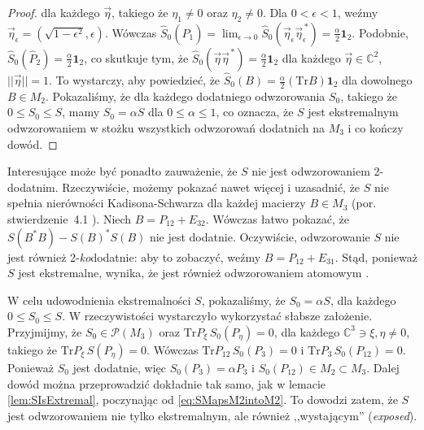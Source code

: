 {\begin{proof}
dla każdego $\vec{\eta}$, takiego że $\eta_{1} \neq 0$ oraz $\eta_{2} \neq 0$.
Dla $0 \!<\!\epsilon \!<\! 1$,
weźmy $\vec{\eta}_{\epsilon} = (\sqrt{1 - \epsilon^{2}}, \epsilon)$.
Wówczas $\hat{S}_{0} (\hat{P}_{1}) =
\lim_{\epsilon \rightarrow 0} \hat{S}_{0}
    (\vec{\eta}_{\epsilon} \vec{\eta}_{\epsilon}^{\,*}) =
\frac{\alpha}{2} \mathbf{1}_{2}$.
Podobnie,
$\hat{S}_{0} (\hat{P}_{2}) = \frac{\alpha}{2} \mathbf{1}_{2}$,
co skutkuje tym, że
$\hat{S}_{0} (\vec{\eta} \vec{\eta}^{\,*}) = \frac{\alpha}{2} \mathbf{1}_{2}$
dla każdego $\vec{\eta} \in \mathbb{C}^{2}$,
$||\vec{\eta}|| = 1$.
To wystarczy, aby powiedzieć, że
$\hat{S}_{0}(B) = \frac{\alpha}{2} (\text{Tr} B) \mathbf{1}_{2}$
dla dowolnego $B \in M_{2}$.
Pokazaliśmy, że dla każdego dodatniego odwzorowania $S_{0}$, takiego że
$0 \leq S_{0} \leq S$, mamy
$S_{0} = \alpha S$ dla $0 \leq \alpha \leq 1$,
co oznacza, że $S$ jest ekstremalnym odwzorowaniem w stożku wszystkich
odwzorowań dodatnich na $M_{3}$ i co kończy dowód.
\end{proof}

Interesujące może być ponadto zauważenie, że $S$ nie jest odwzorowaniem
2-dodatnim.
Rzeczywiście,
możemy pokazać nawet więcej i uzasadnić, że $S$
nie spełnia nierówności Kadisona-Schwarza dla każdej macierzy
$B \in M_{3}$ (por. stwierdzenie \,4.1 \cite{choi1980some}).
Niech
$B = P_{12} + E_{32}$.
Wówczas łatwo pokazać, że
$S(B^{*} B) - S(B)^{*} S(B)$
nie jest dodatnie.
Oczywiście, odwzorowanie $S$ nie jest również 2-\emph{ko}dodatnie:
aby to zobaczyć, weźmy $B = P_{12} + E_{31}$.
Stąd, ponieważ $S$ jest ekstremalne,
wynika, że jest również odwzorowaniem atomowym
\cite{ha1998atomic}.

W celu udowodnienia ekstremalności $S$,
pokazaliśmy, że $S_{0} = \alpha S$,
dla każdego $0 \leq S_{0} \leq S$.
W rzeczywistości wystarczyło wykorzystać słabsze założenie.
Przyjmijmy, że $S_{0} \in \mathcal{P}(M_{3})$ oraz
$\text{Tr} P_{\xi} \, S_{0}(P_{\eta}) = 0$,
dla każdego $\mathbb{C}^{3} \ni \xi,\eta \neq 0$,
takiego że $\text{Tr} P_{\xi} \, S(P_{\eta}) = 0$.
Wówczas $\text{Tr} P_{12} \, S_{0}(P_{3}) = 0$ i
$\text{Tr} P_{3} \, S_{0}(P_{12}) = 0$.
Ponieważ $S_{0}$ jest dodatnie, więc $S_{0}(P_{3}) = \alpha P_{3}$
i $S_{0}(P_{12}) \in M_{2} \! \subset \! M_{3}$.
Dalej dowód można przeprowadzić dokładnie tak samo, jak w
lemacie \ref{lem:SIsExtremal},
poczynając od \eqref{eq:SMapsM2intoM2}.
To dowodzi zatem, że $S$ jest odwzorowaniem nie tylko ekstremalnym,
ale również ,,wystającym'' (\emph{exposed}).

\vspace{0.5cm}

}
